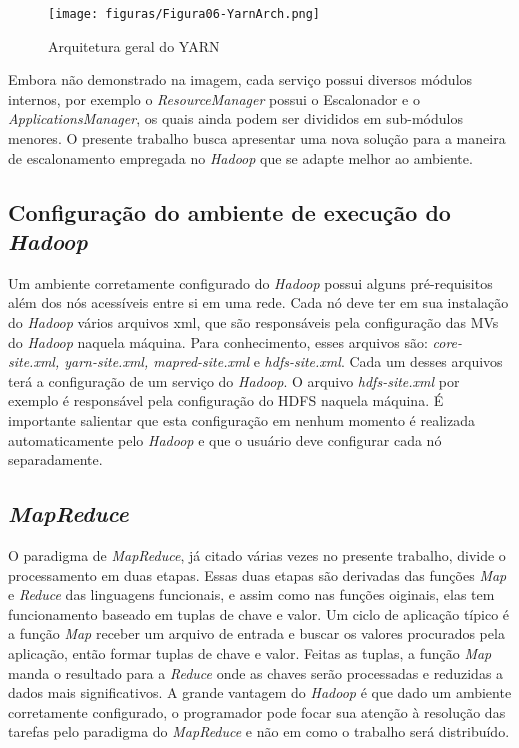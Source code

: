 \begin{figure}[hbtn]
   \centering
   \texttt{[image: figuras/Figura06-YarnArch.png]}
   \caption{Arquitetura geral do YARN \cite{YARN}}
   \label{fig:ArqYARN}
\end{figure}

Embora não demonstrado na imagem, cada serviço possui diversos módulos internos, por exemplo o \emph{ResourceManager} possui o Escalonador e o \emph{ApplicationsManager}, os quais ainda podem ser divididos em sub-módulos menores. O presente trabalho busca apresentar uma nova solução para a maneira de escalonamento empregada no \emph{Hadoop} que se adapte melhor ao ambiente.

\subsection{Configuração do ambiente de execução do \emph{Hadoop}}
Um ambiente corretamente configurado do \emph{Hadoop} possui alguns pré-requisitos além dos nós acessíveis entre si em uma rede. Cada nó deve ter em sua instalação do \emph{Hadoop} vários arquivos xml, que são responsáveis pela configuração das MVs do \emph{Hadoop} naquela máquina.
Para conhecimento, esses arquivos são: \emph{core-site.xml, yarn-site.xml, mapred-site.xml} e \emph{hdfs-site.xml}. Cada um desses arquivos terá a configuração de um serviço do \emph{Hadoop}. O arquivo \emph{hdfs-site.xml} por exemplo é responsável pela configuração do HDFS naquela máquina.
É importante salientar que esta configuração em nenhum momento é realizada automaticamente pelo \emph{Hadoop} e que o usuário deve configurar cada nó separadamente.


\subsection{\emph{MapReduce}}
O paradigma de \emph{MapReduce}, já citado várias vezes no presente trabalho, divide o processamento em duas etapas. Essas duas etapas são derivadas das funções \emph{Map} e \emph{Reduce} das linguagens funcionais, e assim como nas funções oiginais, elas tem funcionamento baseado em tuplas de chave e valor. Um ciclo de aplicação típico é a função \emph{Map} receber um arquivo de entrada e buscar os valores procurados pela aplicação, então formar tuplas de chave e valor. Feitas as tuplas, a função \emph{Map} manda o resultado para a \emph{Reduce} onde as chaves serão processadas e reduzidas a dados mais significativos. A grande vantagem do \emph{Hadoop} é que dado um ambiente corretamente configurado, o programador pode focar sua atenção à resolução das tarefas pelo paradigma do \emph{MapReduce} e não em como o trabalho será distribuído.

